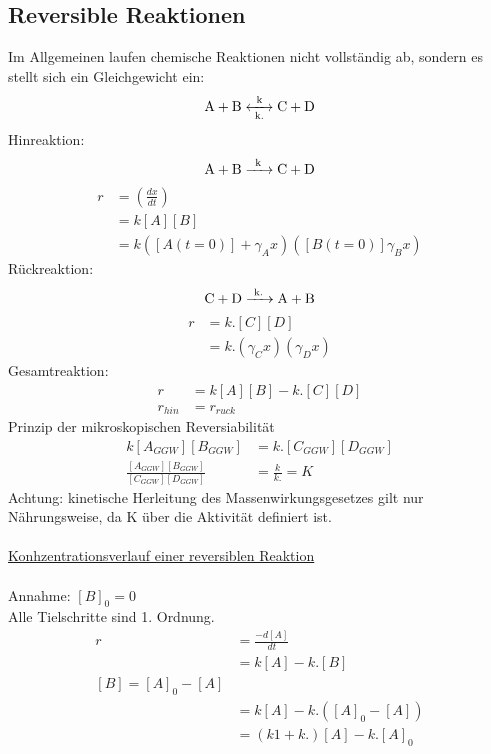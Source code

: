 \documentclass[a4paper, fleqn]{article}
\begin{document}
\subsection{Reversible Reaktionen}
Im Allgemeinen laufen chemische Reaktionen nicht vollständig ab, sondern es stellt sich ein Gleichgewicht ein:
\begin{equation*}
    \ce{A + B <->[{k}][{k.}] C + D}
\end{equation*}
Hinreaktion:
\begin{equation*}
    \ce{A + B ->[{k}] C + D}
\end{equation*}
\begin{align*}
    r &= \left(\frac{dx}{dt}\right)\\
    &= k[A][B]\\
    &= k([A(t=0)]+\gamma_Ax)([B(t=0)]\gamma_Bx)
\end{align*}
Rückreaktion:
\begin{equation*}
    \ce{C + D ->[{k.}] A + B}
\end{equation*}
\begin{align*}
    r &= k.[C][D]\\
    &= k.(\gamma_Cx)(\gamma_Dx)
\end{align*}
Gesamtreaktion:
\begin{align*}
    r &= k[A][B]-k.[C][D]\\
    r_{hin} &= r_{ruck}
\end{align*}
Prinzip der mikroskopischen Reversiabilität
\begin{align*}
    k[A_{GGW}][B_{GGW}]&= k.[C_{GGW}][D_{GGW}]\\
    \frac{[A_{GGW}][B_{GGW}]}{[C_{GGW}][D_{GGW}]} &= \frac{k}{k.} = K
\end{align*}
Achtung: kinetische Herleitung des Massenwirkungsgesetzes gilt nur Nährungsweise, da K über die Aktivität definiert ist.\\\\
\underline{Konhzentrationsverlauf einer reversiblen Reaktion}\\
\\
Annahme: $[B]_0 = 0$\\
Alle Tielschritte sind 1. Ordnung.\\
\begin{align*}
    r &= \frac{-d[A]}{dt}\\
    &= k[A]-k.[B]\\
    [B] = [A]_0 - [A]\\
    &= k[A]-k.([A]_0-[A])\\
    &= (k1+k.)[A]-k.[A]_0
\end{align*}
\end{document}
